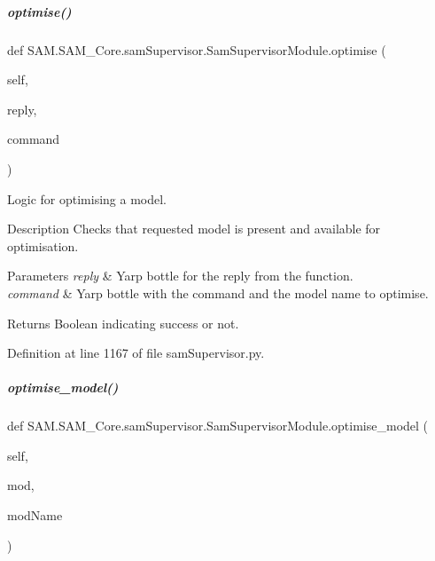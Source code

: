 \mbox{\label{group__icubclient__SAM__Core_a78a19d8b34c5f62c2d6b52aedfe8d937}} 
\subparagraph{\texorpdfstring{optimise()}{optimise()}}
{\footnotesize\ttfamily def S\+A\+M.\+S\+A\+M\+\_\+\+Core.\+sam\+Supervisor.\+Sam\+Supervisor\+Module.\+optimise (\begin{DoxyParamCaption}\item[{}]{self,  }\item[{}]{reply,  }\item[{}]{command }\end{DoxyParamCaption})}



Logic for optimising a model. 

\begin{DoxyParagraph}{Description}
Checks that requested model is present and available for optimisation.
\end{DoxyParagraph}

\begin{DoxyParams}{Parameters}
{\em reply} & Yarp bottle for the reply from the function. \\
\hline
{\em command} & Yarp bottle with the command and the model name to optimise.\\
\hline
\end{DoxyParams}
\begin{DoxyParagraph}{Returns}
Boolean indicating success or not. 
\end{DoxyParagraph}


Definition at line 1167 of file sam\+Supervisor.\+py.

\mbox{\label{group__icubclient__SAM__Core_a28979a7200a6e5237947b24683ca4a6e}} 
\subparagraph{\texorpdfstring{optimise\+\_\+model()}{optimise\_model()}}
{\footnotesize\ttfamily def S\+A\+M.\+S\+A\+M\+\_\+\+Core.\+sam\+Supervisor.\+Sam\+Supervisor\+Module.\+optimise\+\_\+model (\begin{DoxyParamCaption}\item[{}]{self,  }\item[{}]{mod,  }\item[{}]{mod\+Name }\end{DoxyParamCaption})}



